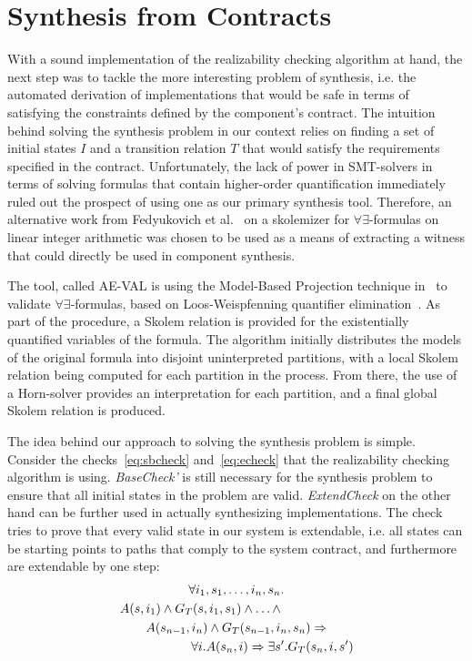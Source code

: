 \section{Synthesis from Contracts}
\label{sec:synthesis}

With a sound implementation of the realizability checking algorithm at
hand, the next step was to tackle the more
interesting problem of synthesis, i.e. the automated derivation of
implementations that would be safe in terms of satisfying the constraints
defined by the component's contract. The intuition behind solving the
synthesis problem in our context relies on finding a set of initial states
$I$ and a transition relation $T$ that would satisfy the requirements
specified in the contract. Unfortunately, the lack of power in SMT-solvers in
terms of solving formulas that contain higher-order quantification immediately
ruled out the prospect of using one as our primary synthesis tool. Therefore, an alternative work from Fedyukovich et al.~\cite{fedyukovichae,fedyukovich2014automated} on a skolemizer for $\forall\exists$-formulas on linear integer arithmetic was chosen to be used as a means of extracting a witness that could directly be used in component synthesis.

The tool, called AE-VAL is using the Model-Based Projection technique
in~\cite{komuravelli2014smt} to validate $\forall\exists$-formulas, based on
Loos-Weispfenning quantifier elimination~\cite{loos1993applying}.
As part of the procedure, a Skolem relation is provided for the existentially quantified variables of the formula. The algorithm
initially distributes the models of the original formula into disjoint
uninterpreted partitions, with a local Skolem relation being computed for each
partition in the process. From there, the use of a Horn-solver provides an
interpretation for each partition, and a final global Skolem relation is produced.

The idea behind our approach to solving the synthesis problem is simple.
Consider the checks~\ref{eq:sbcheck} and~\ref{eq:echeck} that the realizability
checking algorithm is using. \textit{BaseCheck'} is still
necessary for the synthesis problem to ensure that all initial states in the problem are valid.
\textit{ExtendCheck} on the other hand can be further used in actually
synthesizing implementations. The check tries to prove that every valid state in
our system is extendable, i.e. all states can be starting points to paths that
comply to the system contract, and furthermore are extendable by one step:
	\begin{multline*}
		\forall i_1,s_1,\ldots,i_n,s_n. \\
		\hspace{-2cm} A(s,i_1) \wedge G_T(s,i_1,s_1) \wedge \ldots \wedge \\
		A(s_{n-1}, i_n) \wedge G_T(s_{n-1},i_n,s_n) \Rightarrow \\
		\hspace{+2cm} \forall i. A(s_n,i) \Rightarrow \exists s'. G_T(s_n,i,s')
	\end{multline*}

